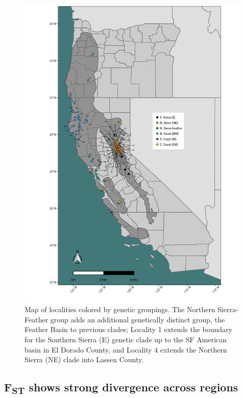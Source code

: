\documentclass[proquest,12pt,final]{ucthesis-CA2012} %
\begin{document}
\begin{ucmainmatter}
\begin{figure}
\includegraphics[width=0.85\linewidth]{figure/ch3/fig_04_maps_all_rabo_filt10_1_100k_clades_localities} \caption{Map of localities colored by genetic groupings. The
Northern Sierra-Feather group adds an additional genetically distinct
group, the Feather Basin to previous clades; Locality 1 extends the
boundary for the Southern Sierra (E) genetic clade up to the SF American
basin in El Dorado County, and Locality 4 extends the Northern Sierra
(NE) clade into Lassen County.}\label{fig:CH3F4map}
\end{figure}
\clearpage

\hypertarget{fst-shows-strong-divergence-across-regions}{%
\subsection{\texorpdfstring{F\textsubscript{ST} shows strong divergence
across
regions}{FST shows strong divergence across regions}}\label{fst-shows-strong-divergence-across-regions}}


\end{ucmainmatter}
\end{document}
